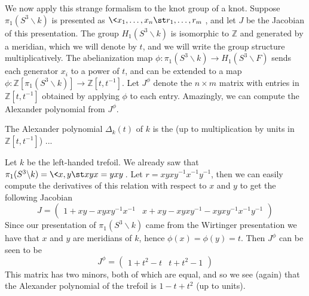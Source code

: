 We now apply this strange formalism to the knot group of a knot. Suppose $\pi_1(S^3 \backslash k)$ is presented as $\< x_1,\ldots,x_n \st r_1,\ldots,r_m \>$, and let $J$ be the Jacobian of this presentation. The group $H_1(S^3 \backslash k)$ is isomorphic to $\mathbb Z$ and generated by a meridian, which we will denote by $t$, and we will write the group structure multiplicatively. The abelianization map $\phi : \pi_1(S^3 \backslash k) \rightarrow H_1(S^3 \backslash F)$ sends each generator $x_i$ to a power of $t$, and can be extended to a map $\phi : \mathbb Z[\pi_1(S^3 \backslash k)] \rightarrow \mathbb Z[t,t^{-1}]$. Let $J^\phi$ denote the $n \times m$ matrix with entries in $\mathbb Z[t,t^{-1}]$ obtained by applying $\phi$ to each entry. Amazingly, we can compute the Alexander polynomial from $J^\phi$.
\begin{prop}
The Alexander polynomial $\Delta_k(t)$ of $k$ is the \unfinished (up to multiplication by units in $\mathbb Z[t,t^{-1}]$) ...
\end{prop}

\begin{example}
Let $k$ be the left-handed trefoil. We already saw that $\pi_1(S^3 \backslash k) = \< x,y \st xyx = yxy \>$. Let $r = xyxy^{-1}x^{-1}y^{-1}$, then we can easily compute the derivatives of this relation with respect to $x$ and $y$ to get the following Jacobian
\[ J = \begin{pmatrix} 1+xy-xyxy^{-1}x^{-1} & x+xy-xyxy^{-1}-xyxy^{-1}x^{-1}y^{-1} \end{pmatrix} \]
Since our presentation of $\pi_1(S^3 \backslash k)$ came from the Wirtinger presentation we have that $x$ and $y$ are meridians of $k$, hence $\phi(x)=\phi(y)=t$. Then $J^\phi$ can be seen to be
\[ J^\phi = \begin{pmatrix} 1+t^2-t & t+t^2-1  \end{pmatrix} \]
This matrix has two minors, both of which are equal, and so we see (again) that the Alexander polynomial of the trefoil is $1-t+t^2$ (up to units).
\end{example}

